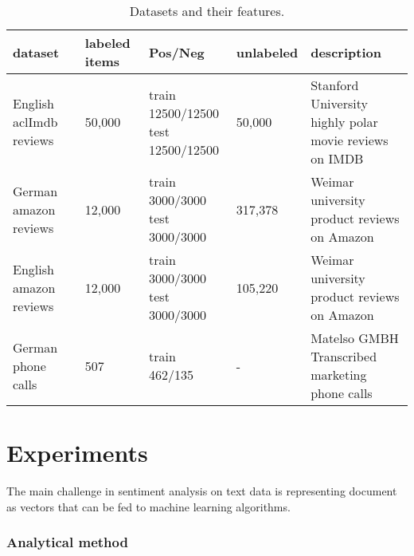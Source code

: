 	\begin{table}
		\begin{center}
			\begin{tabular}{| l | l | l | l | l |}
				\hline
				dataset&labeled items& Pos/Neg & unlabeled & description\\
				\hline
				English aclImdb reviews &50,000 &
				\parbox[t]{2.6cm}{train 12500/12500\\test 12500/12500}
				
				&50,000 &\parbox{5.5cm}{Stanford University\cite{imdbdataset} \\ highly polar movie reviews on IMDB}\\
				\hline
				German amazon reviews&
				12,000&
				\parbox[t]{2.6cm}{train 3000/3000 \\ test 3000/3000 }&
				317,378&
				\parbox{5.5cm}{Weimar university \cite{crosslinguistic-dataset} \\ product reviews on Amazon}\\
				\hline
				English amazon reviews&
				12,000&
				\parbox[t]{2.6cm}{train 3000/3000 \\ test 3000/3000 }&
				105,220&
				\parbox{5.5cm}{Weimar university \cite{crosslinguistic-dataset}\\ product reviews on Amazon}\\
				
				\hline
				German phone calls&
				507&
				\parbox[t]{2.6cm}{train 462/135 }&
				-&
				\parbox{5.5cm}{Matelso GMBH\\ Transcribed marketing phone calls}\\
				\hline
			\end{tabular}
		\end{center}
		\vskip 0.25cm
		\caption{Datasets and their features.}
		\label{tbl:datasets}
	\end{table}
\section{Experiments}
	The main challenge in sentiment analysis on text data is representing document as vectors that can be fed to machine learning algorithms. 
	\subsubsection*{Analytical method}
